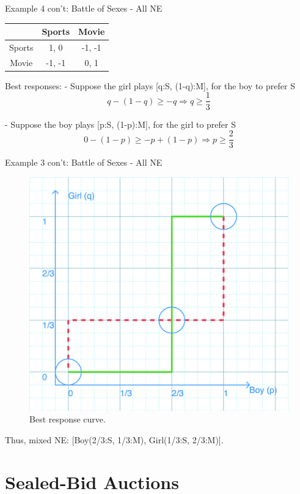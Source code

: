 \documentclass{beamer}
\begin{document}
\begin{frame}{Example 4 con't: Battle of Sexes - All NE}
    \begin{table}[]
        \begin{tabular}{c|c|c|}
        \cline{2-3}
                                 & Sports    & Movie    \\ \hline
        \multicolumn{1}{|c|}{Sports}  & 1, 0 & -1, -1 \\ \hline
        \multicolumn{1}{|c|}{Movie} & -1, -1 & 0, 1 \\ \hline
        \end{tabular}
    \end{table}
    
    \begin{exampleblock}{Best responses:}
    - Suppose the girl plays [q:S, (1-q):M], for the boy to prefer S
    \[
    q - (1-q) \geq -q \Rightarrow q \geq \frac{1}{3} 
    \]
    
    - Suppose the boy plays [p:S, (1-p):M], for the girl to prefer S
    \[
    0 - (1 - p) \geq -p + (1 - p) \Rightarrow p \geq \frac{2}{3}
    \]
    \end{exampleblock}
\end{frame}

\begin{frame}{Example 3 con't: Battle of Sexes - All NE}
\begin{figure}[htpb]
       \centering
       \includegraphics[width=0.5\linewidth]{pic/battleofsexes.png}
       \caption{Best response curve.}  
\end{figure}
Thus, mixed NE: [Boy(2/3:S, 1/3:M), Girl(1/3:S, 2/3:M)].
\end{frame}


\section{Sealed-Bid Auctions}
\end{document}
